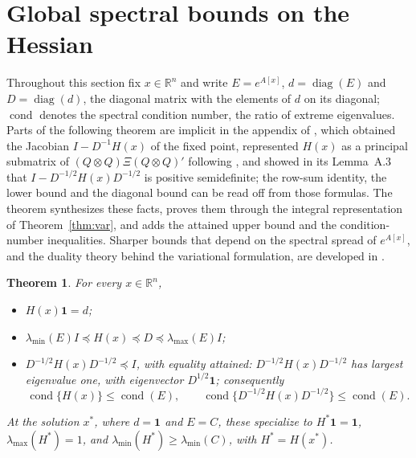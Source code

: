 \documentclass[11pt]{article}
\newcommand{\R}{\mathbb{R}}
\newcommand{\diag}{\operatorname{diag}}
\newcommand{\one}{\mathbf{1}}
\newtheorem{theorem}{Theorem}
\begin{document}
\section{Global spectral bounds on the Hessian}\label{sec:spectral}

Throughout this section fix $x\in\R^{n}$ and write $E=e^{A[x]}$,
$d=\diag(E)$ and $D=\diag(d)$, the diagonal matrix with the elements of
$d$ on its diagonal; $\operatorname{cond}$ denotes the spectral
condition number, the ratio of extreme eigenvalues. Parts of the
following theorem are implicit in the appendix of
\citet{ArchakovHansen:Correlation}, which obtained the Jacobian
$I-D^{-1}H(x)$ of the fixed point, represented $H(x)$ as a principal
submatrix of $(Q\otimes Q)\Xi(Q\otimes Q)'$ following
\citet{LintonMcCrorie:1995}, and showed in its Lemma~A.3 that
$I-D^{-1/2}H(x)D^{-1/2}$ is positive semidefinite; the row-sum
identity, the lower bound and the diagonal bound can be read off from
those formulas. The theorem synthesizes these facts, proves them
through the integral representation of Theorem~\ref{thm:var}, and
adds the attained upper bound and the condition-number inequalities.
Sharper bounds that depend on the spectral spread of $e^{A[x]}$, and
the duality theory behind the variational formulation, are developed
in \citet{ArchakovHansen:Legendre}.

\begin{theorem}\label{prop:spec}
For every $x\in\R^{n}$,
\begin{itemize}
\item[(i)] $H(x)\one=d$;
\item[(ii)] $\lambda_{\min}(E)I\preceq H(x)\preceq D\preceq\lambda_{\max}(E)I$;
\item[(iii)] $D^{-1/2}H(x)D^{-1/2}\preceq I$, with equality attained:
$D^{-1/2}H(x)D^{-1/2}$ has largest eigenvalue one, with eigenvector
$D^{1/2}\one$; consequently
\[
\operatorname{cond}\{H(x)\}\leq\operatorname{cond}(E),
\qquad
\operatorname{cond}\{D^{-1/2}H(x)D^{-1/2}\}\leq\operatorname{cond}(E).
\]
\end{itemize}
At the solution $x^{\ast}$, where $d=\one$ and $E=C$, these specialize
to $H^{\ast}\one=\one$, $\lambda_{\max}(H^{\ast})=1$, and
$\lambda_{\min}(H^{\ast})\geq\lambda_{\min}(C)$, with
$H^{\ast}=H(x^{\ast})$.
\end{theorem}
\end{document}
